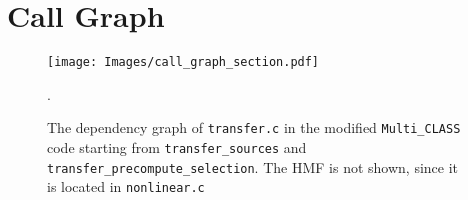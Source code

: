 \chapter{Call Graph}
\label{call_graph}
\vspace{-4cm}
\begin{figure}[H]
    \centering
    \texttt{[image: Images/call\_graph\_section.pdf]}
    \caption[The dependency graph of {\tt transfer.c} in the modified {\tt Multi\_CLASS} code.]{The dependency graph of {\tt transfer.c} in the modified {\tt Multi\_CLASS} code starting from {\tt transfer\_sources} and {\tt transfer\_precompute\_selection}. The HMF is not shown, since it is located in {\tt nonlinear.c}}.
\end{figure} 
\newpage
{}
\listoffigures
